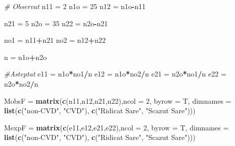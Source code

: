 \documentclass[]{article}
\newenvironment{Shaded}{\begin{snugshade}}{\end{snugshade}}
\newcommand{\KeywordTok}[1]{\textcolor[rgb]{0.13,0.29,0.53}{\textbf{#1}}}
\newcommand{\DataTypeTok}[1]{\textcolor[rgb]{0.13,0.29,0.53}{#1}}
\newcommand{\DecValTok}[1]{\textcolor[rgb]{0.00,0.00,0.81}{#1}}
\newcommand{\StringTok}[1]{\textcolor[rgb]{0.31,0.60,0.02}{#1}}
\newcommand{\CommentTok}[1]{\textcolor[rgb]{0.56,0.35,0.01}{\textit{#1}}}
\newcommand{\OperatorTok}[1]{\textcolor[rgb]{0.81,0.36,0.00}{\textbf{#1}}}
\newcommand{\NormalTok}[1]{#1}
\begin{document}
\begin{Shaded}
\begin{Highlighting}[]
\CommentTok{# Observat}
\NormalTok{n11 =}\StringTok{ }\DecValTok{2}
\NormalTok{n1o =}\StringTok{ }\DecValTok{25}
\NormalTok{n12 =}\StringTok{ }\NormalTok{n1o}\OperatorTok{-}\NormalTok{n11}

\NormalTok{n21 =}\StringTok{ }\DecValTok{5}
\NormalTok{n2o =}\StringTok{ }\DecValTok{35}
\NormalTok{n22 =}\StringTok{ }\NormalTok{n2o}\OperatorTok{-}\NormalTok{n21}

\NormalTok{no1 =}\StringTok{ }\NormalTok{n11}\OperatorTok{+}\NormalTok{n21}
\NormalTok{no2 =}\StringTok{ }\NormalTok{n12}\OperatorTok{+}\NormalTok{n22}

\NormalTok{n =}\StringTok{ }\NormalTok{n1o}\OperatorTok{+}\NormalTok{n2o}

\CommentTok{#Asteptat}
\NormalTok{e11 =}\StringTok{ }\NormalTok{n1o}\OperatorTok{*}\NormalTok{no1}\OperatorTok{/}\NormalTok{n}
\NormalTok{e12 =}\StringTok{ }\NormalTok{n1o}\OperatorTok{*}\NormalTok{no2}\OperatorTok{/}\NormalTok{n}
\NormalTok{e21 =}\StringTok{ }\NormalTok{n2o}\OperatorTok{*}\NormalTok{no1}\OperatorTok{/}\NormalTok{n}
\NormalTok{e22 =}\StringTok{ }\NormalTok{n2o}\OperatorTok{*}\NormalTok{no2}\OperatorTok{/}\NormalTok{n}

\NormalTok{MobsF =}\StringTok{ }\KeywordTok{matrix}\NormalTok{(}\KeywordTok{c}\NormalTok{(n11,n12,n21,n22),}\DataTypeTok{ncol =} \DecValTok{2}\NormalTok{, }\DataTypeTok{byrow =}\NormalTok{ T, }
               \DataTypeTok{dimnames =} \KeywordTok{list}\NormalTok{(}\KeywordTok{c}\NormalTok{(}\StringTok{"non-CVD"}\NormalTok{, }\StringTok{"CVD"}\NormalTok{), }
                               \KeywordTok{c}\NormalTok{(}\StringTok{"Ridicat Sare"}\NormalTok{, }\StringTok{"Scazut Sare"}\NormalTok{)))}

\NormalTok{MexpF =}\StringTok{ }\KeywordTok{matrix}\NormalTok{(}\KeywordTok{c}\NormalTok{(e11,e12,e21,e22),}\DataTypeTok{ncol =} \DecValTok{2}\NormalTok{, }\DataTypeTok{byrow =}\NormalTok{ T, }
               \DataTypeTok{dimnames =} \KeywordTok{list}\NormalTok{(}\KeywordTok{c}\NormalTok{(}\StringTok{"non-CVD"}\NormalTok{, }\StringTok{"CVD"}\NormalTok{), }
                               \KeywordTok{c}\NormalTok{(}\StringTok{"Ridicat Sare"}\NormalTok{, }\StringTok{"Scazut Sare"}\NormalTok{)))}
\end{Highlighting}
\end{Shaded}

\end{document}
